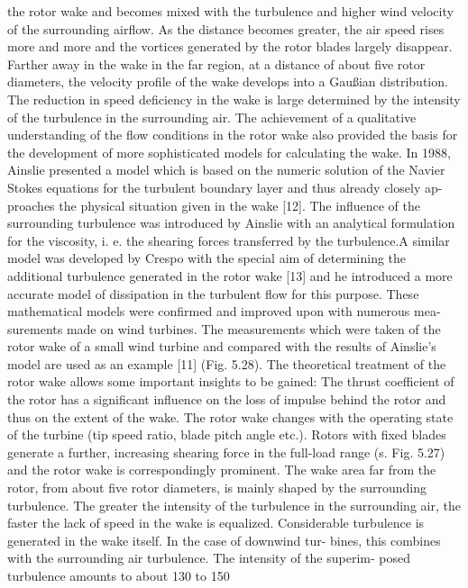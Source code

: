 the rotor wake and becomes mixed with the turbulence and higher wind velocity of the
surrounding airflow. As the distance becomes greater, the air speed rises more and more
and the vortices generated by the rotor blades largely disappear.
Farther away in the wake in the far region, at a distance of about five rotor diameters,
the velocity profile of the wake develops into a Gaußian distribution. The reduction in
speed deficiency in the wake is large determined by the intensity of the turbulence in the
surrounding air.
The achievement of a qualitative understanding of the flow conditions in the rotor wake
also provided the basis for the development of more sophisticated models for calculating
the wake. In 1988, Ainslie presented a model which is based on the numeric solution of
the Navier Stokes equations for the turbulent boundary layer and thus already closely ap-
proaches the physical situation given in the wake [12]. The influence of the surrounding
turbulence was introduced by Ainslie with an analytical formulation for the viscosity, i. e.
the shearing forces transferred by the turbulence.A similar model was developed by Crespo
with the special aim of determining the additional turbulence generated in the rotor wake
[13] and he introduced a more accurate model of dissipation in the turbulent flow for this
purpose.
These mathematical models were confirmed and improved upon with numerous mea-
surements made on wind turbines. The measurements which were taken of the rotor wake
of a small wind turbine and compared with the results of Ainslie’s model are used as an
example [11] (Fig. 5.28).
The theoretical treatment of the rotor wake allows some important insights to be gained:
The thrust coefficient of the rotor has a significant influence on the loss of impulse behind
the rotor and thus on the extent of the wake. The rotor wake changes with the operating
state of the turbine (tip speed ratio, blade pitch angle etc.). Rotors with fixed blades generate
a further, increasing shearing force in the full-load range (s. Fig. 5.27) and the rotor wake
is correspondingly prominent.
The wake area far from the rotor, from about five rotor diameters, is mainly shaped by
the surrounding turbulence. The greater the intensity of the turbulence in the surrounding
air, the faster the lack of speed in the wake is equalized.
Considerable turbulence is generated in the wake itself. In the case of downwind tur-
bines, this combines with the surrounding air turbulence. The intensity of the superim-
posed turbulence amounts to about 130 to 150 %
